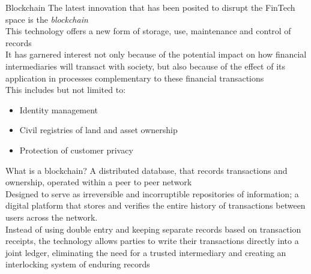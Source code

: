 \documentclass[11pt]{beamer}
\begin{document}
\begin{frame}{Blockchain}
	The latest innovation that has been posited to disrupt the FinTech space is the \textit{blockchain} \\\vspace{3mm}
	This technology offers a new form of storage, use, maintenance and control of records \\\vspace{3mm}
	It has garnered interest not only because of the potential impact on how financial intermediaries will transact with society, but also because of the effect of its application in processes complementary to these financial transactions\\\vspace{3mm}
	This includes but not limited to:
	\begin{itemize}
		\item Identity management
		\item Civil registries of land and asset ownership
		\item Protection of customer privacy
	\end{itemize}
\end{frame}


\begin{frame}{What is a blockchain?}
	A distributed database, that records transactions and ownership, operated within a peer to peer network\\ \vspace{3mm}
	Designed to serve as irreversible and incorruptible repositories of information; a digital platform that stores and verifies the entire history of transactions between users across the network. \\ \vspace{3mm}
	Instead of using double entry and keeping separate records based on transaction receipts, the technology allows parties to write their transactions directly into a joint ledger, eliminating the need for a trusted intermediary and creating an interlocking system of enduring records \\ \vspace{3mm}
\end{frame}

\end{document}

